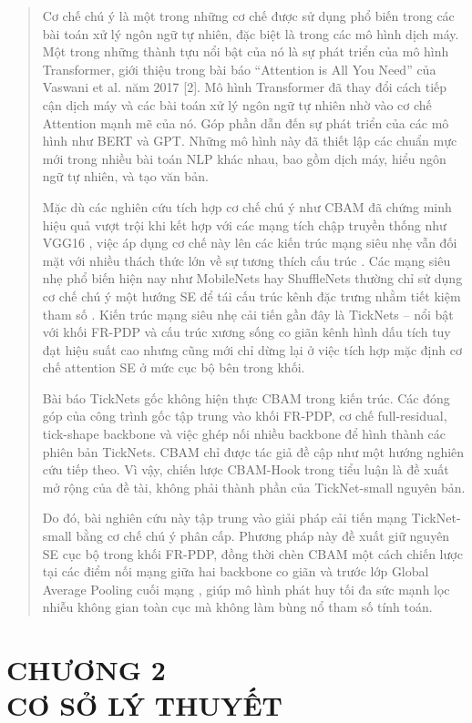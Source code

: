 \documentclass[
  12pt,
  a4paper,
]{report}
\begin{document}
\begin{quote}
Cơ chế chú ý là một trong những cơ chế được sử dụng phổ biến trong các
bài toán xử lý ngôn ngữ tự nhiên, đặc biệt là trong các mô hình dịch
máy. Một trong những thành tựu nổi bật của nó là sự phát triển của mô
hình Transformer, giới thiệu trong bài báo ``Attention is All You Need''
của Vaswani et al. năm 2017 {[}2{]}. Mô hình Transformer đã thay đổi
cách tiếp cận dịch máy và các bài toán xử lý ngôn ngữ tự nhiên nhờ vào
cơ chế Attention mạnh mẽ của nó. Góp phần dẫn đến sự phát triển của các
mô hình như BERT và GPT. Những mô hình này đã thiết lập các chuẩn mực
mới trong nhiều bài toán NLP khác nhau, bao gồm dịch máy, hiểu ngôn ngữ
tự nhiên, và tạo văn bản.

Mặc dù các nghiên cứu tích hợp cơ chế chú ý như CBAM đã chứng minh hiệu
quả vượt trội khi kết hợp với các mạng tích chập truyền thống như VGG16
, việc áp dụng cơ chế này lên các kiến trúc mạng siêu nhẹ vẫn đối mặt
với nhiều thách thức lớn về sự tương thích cấu trúc . Các mạng siêu nhẹ
phổ biến hiện nay như MobileNets hay ShuffleNets thường chỉ sử dụng cơ
chế chú ý một hướng SE để tái cấu trúc kênh đặc trưng nhằm tiết kiệm
tham số . Kiến trúc mạng siêu nhẹ cải tiến gần đây là TickNets -- nổi
bật với khối FR-PDP và cấu trúc xương sống co giãn kênh hình dấu tích
tuy đạt hiệu suất cao nhưng cũng mới chỉ dừng lại ở việc tích hợp mặc
định cơ chế attention SE ở mức cục bộ bên trong khối.

Bài báo TickNets gốc không hiện thực CBAM trong kiến trúc. Các đóng góp
của công trình gốc tập trung vào khối FR-PDP, cơ chế full-residual,
tick-shape backbone và việc ghép nối nhiều backbone để hình thành các
phiên bản TickNets. CBAM chỉ được tác giả đề cập như một hướng nghiên
cứu tiếp theo. Vì vậy, chiến lược CBAM-Hook trong tiểu luận là đề xuất
mở rộng của đề tài, không phải thành phần của TickNet-small nguyên bản.

Do đó, bài nghiên cứu này tập trung vào giải pháp cải tiến mạng
TickNet-small bằng cơ chế chú ý phân cấp. Phương pháp này đề xuất giữ
nguyên SE cục bộ trong khối FR-PDP, đồng thời chèn CBAM một cách chiến
lược tại các điểm nối mạng giữa hai backbone co giãn và trước lớp Global
Average Pooling cuối mạng , giúp mô hình phát huy tối đa sức mạnh lọc
nhiễu không gian toàn cục mà không làm bùng nổ tham số tính toán.
\end{quote}

\chapter*{\texorpdfstring{CHƯƠNG 2\\
CƠ SỞ LÝ
THUYẾT}{CHƯƠNG 2 CƠ SỞ LÝ THUYẾT}}\label{chux1b0ux1a1ng-2-cux1a1-sux1edf-luxfd-thuyux1ebft}
\end{document}
